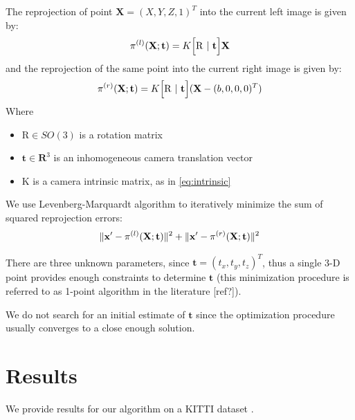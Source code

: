\documentclass[runningheads]{llncs}
\DeclarePairedDelimiter{\norm}{\lVert}{\rVert}
\begin{document}
The reprojection of point $\mathbf{X}=(X,Y,Z,1)^T$ into the current
left image is given by:
\begin{equation}
  \pi^{(l)}(\mathbf{X};\mathbf{t}) =  K\Bigl[ \mathrm{R}\ |\ \mathbf{t} \Bigr]\mathbf{X} 
\end{equation}
and the reprojection of the same point into the current right image is
given by:
\begin{equation}
  \pi^{(r)}(\mathbf{X};\mathbf{t}) =  K\Bigl[ \mathrm{R}\ |\ \mathbf{t} \Bigr](\mathbf{X} - (b,0,0,0)^T)
\end{equation}
Where 
\begin{itemize}
\item $\mathrm{R}\in SO(3)$ is a rotation matrix
\item $\mathbf{t}\in \mathbf{R}^3$ is an inhomogeneous camera translation vector
\item $\mathrm{K}$ is a camera intrinsic matrix, as in \ref{eq:intrinsic}
\end{itemize}

We use Levenberg-Marquardt algorithm to iteratively minimize the sum
of squared reprojection errors:
\begin{equation}
\norm{\mathbf{x'} - \pi^{(l)}(\mathbf{X};\mathbf{t})}^2 + \norm{\mathbf{x'} - \pi^{(r)}(\mathbf{X};\mathbf{t})}^2
\end{equation}

There are three unknown parameters, since $\mathbf{t} =
(t_x,t_y,t_z)^T$, thus a single 3-D point provides enough constraints
to determine $\mathbf{t}$ (this minimization procedure is referred to
as 1-point algorithm in the literature [ref?]).

We do not search for an initial estimate of $\mathbf{t}$ since the
optimization procedure usually converges to a close enough solution.

\section{Results}

We provide results for our algorithm on a KITTI dataset
\cite{Geiger2012}.
\end{document}
